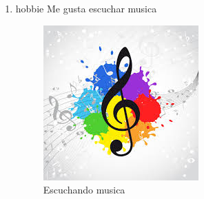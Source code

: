 \begin{enumerate}
\item hobbie Me gusta escuchar musica

  \begin{figure}[h]
    \centering
    \includegraphics[scale=0.5]{IMG/17_2.jpg}
    \caption{Escuchando musica}
  \end{figure}
  
\end{enumerate}

